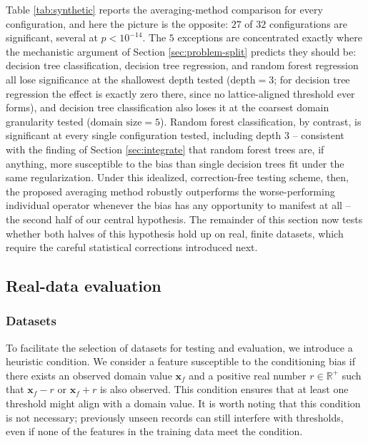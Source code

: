 \documentclass[5p,twocolumn,authoryear]{elsarticle}
\theoremstyle{plain}%
\theoremstyle{remark}%
\theoremstyle{definition}%
\begin{document}
Table \ref{tab:synthetic} reports the averaging-method comparison for every configuration, and here the picture is the opposite: $27$ of $32$ configurations are significant, several at $p<10^{-14}$. The $5$ exceptions are concentrated exactly where the mechanistic argument of Section \ref{sec:problem-split} predicts they should be: decision tree classification, decision tree regression, and random forest regression all lose significance at the shallowest depth tested ($\text{depth}=3$; for decision tree regression the effect is exactly zero there, since no lattice-aligned threshold ever forms), and decision tree classification also loses it at the coarsest domain granularity tested ($\text{domain size}=5$). Random forest classification, by contrast, is significant at every single configuration tested, including depth $3$ -- consistent with the finding of Section \ref{sec:integrate} that random forest trees are, if anything, more susceptible to the bias than single decision trees fit under the same regularization. Under this idealized, correction-free testing scheme, then, the proposed averaging method robustly outperforms the worse-performing individual operator whenever the bias has any opportunity to manifest at all -- the second half of our central hypothesis. The remainder of this section now tests whether both halves of this hypothesis hold up on real, finite datasets, which require the careful statistical corrections introduced next.


\subsection{Real-data evaluation}
\label{sec:real-data}


\subsubsection{Datasets}
\label{sec:tests-datasets}

To facilitate the selection of datasets for testing and evaluation, we introduce a heuristic condition. We consider a feature susceptible to the conditioning bias if there exists an observed domain value $\mathbf{x}_f$ and a positive real number $r\in\mathbb{R}^+$ such that $\mathbf{x}_f-r$ or $\mathbf{x}_f+r$ is also observed. This condition ensures that at least one threshold might align with a domain value. It is worth noting that this condition is not necessary; previously unseen records can still interfere with thresholds, even if none of the features in the training data meet the condition.
\end{document}
